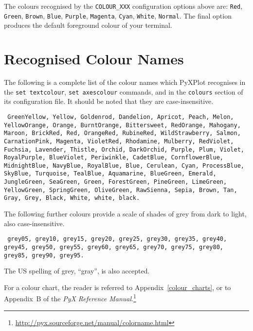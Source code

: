 The colours recognised by the {\tt COLOUR\_XXX} configuration options above are: {\tt Red}, {\tt Green}, {\tt Brown}, {\tt Blue}, {\tt Purple}, {\tt Magenta}, {\tt Cyan}, {\tt White}, {\tt Normal}. The final option produces the default foreground colour of your terminal.

\section{Recognised Colour Names}
\label{colour_names}

The following is a complete list of the colour names which PyXPlot recognises in the {\tt set textcolour}, {\tt set axescolour} commands, and in the {\tt colours} section of its configuration file. It should be noted that they are case-insensitive.

\vspace{5mm}\noindent
{}
{\tt
GreenYellow, Yellow, Goldenrod, Dandelion, Apricot, Peach, Melon, YellowOrange, Orange, BurntOrange, Bittersweet, RedOrange, Mahogany, Maroon, BrickRed, Red, OrangeRed, RubineRed, WildStrawberry, Salmon, CarnationPink, Magenta, VioletRed, Rhodamine, Mulberry, RedViolet, Fuchsia, Lavender, Thistle, Orchid, DarkOrchid, Purple, Plum, Violet, RoyalPurple, BlueViolet, Periwinkle, CadetBlue, CornflowerBlue, MidnightBlue, NavyBlue, RoyalBlue, Blue, Cerulean, Cyan, ProcessBlue, SkyBlue, Turquoise, TealBlue, Aquamarine, BlueGreen, Emerald, JungleGreen, SeaGreen, Green, ForestGreen, PineGreen, LimeGreen, YellowGreen, SpringGreen, OliveGreen, RawSienna, Sepia, Brown, Tan, Gray, Grey, Black, White, white, black.
}

\vspace{5mm}
The following further colours provide a scale of shades of grey from dark to light, also case-insensitive.

\vspace{5mm}\noindent
{}
{\tt
grey05, grey10, grey15, grey20, grey25, grey30, grey35, grey40, grey45, grey50, grey55, grey60, grey65, grey70, grey75, grey80, grey85, grey90, grey95.
}

\vspace{5mm}\noindent
The US spelling of grey, ``gray'', is also accepted.

For a colour chart, the reader is referred to Appendix~\ref{colour_charts}, or to Appendix~B of the {\it PyX Reference Manual}.\footnote{\url{http://pyx.sourceforge.net/manual/colorname.html}}
